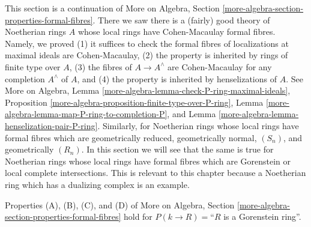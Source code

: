 \noindent
This section is a continuation of
More on Algebra, Section \ref{more-algebra-section-properties-formal-fibres}.
There we saw there is a (fairly) good theory of Noetherian rings $A$
whose local rings have Cohen-Macaulay formal fibres. Namely, we proved
(1) it suffices to check the formal fibres of localizations at
maximal ideals are Cohen-Macaulay,
(2) the property is inherited by rings of finite type over $A$,
(3) the fibres of $A \to A^\wedge$ are Cohen-Macaulay for
any completion $A^\wedge$ of $A$, and
(4) the property is inherited by henselizations of $A$. See
More on Algebra, Lemma \ref{more-algebra-lemma-check-P-ring-maximal-ideals},
Proposition \ref{more-algebra-proposition-finite-type-over-P-ring},
Lemma \ref{more-algebra-lemma-map-P-ring-to-completion-P}, and
Lemma \ref{more-algebra-lemma-henselization-pair-P-ring}.
Similarly, for Noetherian rings whose local rings have formal fibres
which are geometrically reduced, geometrically normal, $(S_n)$, and
geometrically $(R_n)$.
In this section we will see that the same is true for Noetherian rings
whose local rings have formal fibres which are Gorenstein
or local complete intersections.
This is relevant to this chapter because a Noetherian ring which has a
dualizing complex is an example.

\begin{lemma}
\label{lemma-formal-fibres-gorenstein}
Properties (A), (B), (C), and (D) of
More on Algebra, Section \ref{more-algebra-section-properties-formal-fibres}
hold for $P(k \to R) =$``$R$ is a Gorenstein ring''.
\end{lemma}

